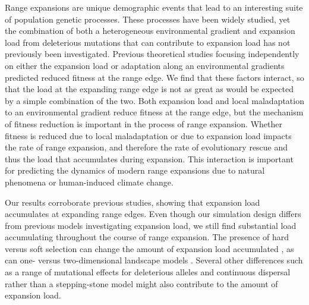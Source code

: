 Range expansions are unique demographic events that lead to an interesting suite of population genetic processes. These processes have been widely studied, yet the combination of both a heterogeneous environmental gradient and expansion load from deleterious mutations that can contribute to expansion load has not previously been investigated. Previous theoretical studies focusing independently on either the expansion load or adaptation along an environmental gradients predicted reduced fitness at the range edge. We find that these factors interact, so that the load at the expanding range edge is not as great as would be expected by a simple combination of the two. Both expansion load and local maladaptation to an environmental gradient reduce fitness at the range edge, but the mechanism of fitness reduction is important in the process of range expansion. Whether fitness is reduced due to local maladaptation or due to expansion load impacts the rate of range expansion, and therefore the rate of evolutionary rescue and thus the load that accumulates during expansion. This interaction is important for predicting the dynamics of modern range expansions due to natural phenomena or human-induced climate change. 

Our results corroborate previous studies, showing that expansion load accumulates at expanding range edges. Even though our simulation design differs from previous models investigating expansion load, we still find substantial load accumulating throughout the course of range expansion. The presence of hard versus soft selection can change the amount of expansion load accumulated \citep{Peischl:2013, Peischl:2015}, as can one- versus two-dimensional landscape models \citep{Peischl:2013}. Several other differences such as a range of mutational effects for deleterious alleles and continuous dispersal rather than a stepping-stone model might also contribute to the amount of expansion load.


